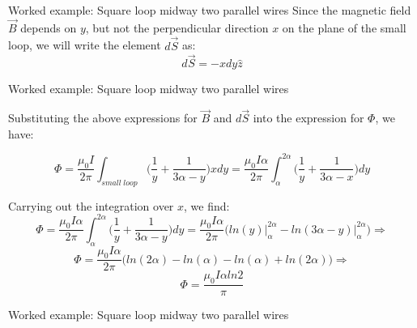 {\begin{frame}{Worked example: Square loop midway two parallel wires}
   Since the magnetic field $\vec{B}$ depends on $y$, but not the perpendicular
   direction $x$ on the plane of the small loop, we will write the
   element $d\vec{S}$ as:
   \begin{equation*}
     d\vec{S} = - x dy \hat{z}
   \end{equation*}

 \end{frame}


 \begin{frame}{Worked example: Square loop midway two parallel wires}

   Substituting the above expressions for $\vec{B}$ and $d\vec{S}$ into the
   expression for $\Phi$, we have:

   \begin{equation*}
     \Phi = \frac{\mu_0 I}{2\pi}
             \int_{small\;loop}
               \Big( \frac{1}{y} +
                     \frac{1}{3\alpha-y} \Big) x dy =
           \frac{\mu_0 I \alpha}{2\pi}
           \int_{\alpha}^{2\alpha}
             \Big( \frac{1}{y} +
                   \frac{1}{3\alpha-x} \Big) dy
   \end{equation*}

   \vspace{0.3cm}

   Carrying out the integration over $x$, we find:
   \begin{equation*}
     \Phi = \frac{\mu_0 I \alpha}{2\pi}
            \int_{\alpha}^{2\alpha}
             \Big( \frac{1}{y} +
                   \frac{1}{3\alpha-y} \Big) dy
         = \frac{\mu_0 I \alpha}{2\pi}
             \Big( ln(y)\Big\rvert_{\alpha}^{2\alpha} -
                   ln(3\alpha-y)\Big\rvert_{\alpha}^{2\alpha} \Big) \Rightarrow
   \end{equation*}
   \begin{equation*}
     \Phi = \frac{\mu_0 I \alpha}{2\pi}
             \Big( ln(2\alpha) - ln(\alpha)
                 - ln(\alpha) + ln(2\alpha) \Big) \Rightarrow
   \end{equation*}
   \begin{equation*}
     \Phi = \frac{\mu_0 I \alpha ln2}{\pi}
   \end{equation*}

\end{frame}


\begin{frame}{Worked example: Square loop midway two parallel wires}


\end{frame}}
